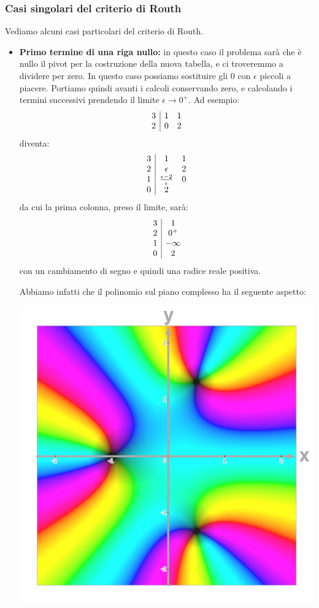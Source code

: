 \documentclass[a4paper,11pt]{article}
\begin{document}
\subsubsection{Casi singolari del criterio di Routh}
Vediamo alcuni casi particolari del criterio di Routh.
\begin{itemize}
\item \textbf{Primo termine di una riga nullo:} in questo caso il problema sarà che è nullo il pivot per la costruzione della nuova tabella, e ci troveremmo a dividere per zero.
In questo caso possiamo sostituire gli 0 con $\epsilon$ piccoli a piacere.
Portiamo quindi avanti i calcoli conservando zero, e calcolando i termini successivi prendendo il limite $\epsilon \rightarrow 0^+$.
Ad esempio:
$$
\begin{array}{c | c c}
	3 & 1 & 1 \\
	2 & 0 & 2
\end{array}
$$
diventa:
$$
\begin{array}{c | c c}
	3 & 1 & 1 \\
	2 & \epsilon & 2 \\
	1 & \frac{\epsilon - 2}{\epsilon} & 0 \\
	0 & 2
\end{array}
$$
da cui la prima colonna, preso il limite, sarà:
$$
\begin{array}{c | c}
	3 & 1 \\
	2 & 0^+ \\
	1 & - \infty \\
	0 & 2
\end{array}
$$
con un cambiamento di segno e quindi una radice reale positiva.

\noindent
\begin{minipage}{\textwidth}
Abbiamo infatti che il polinomio sul piano complesso ha il seguente aspetto:
\begin{center}
	\includegraphics[scale=0.3]{../figures/polynomial_routh_1.png}
\end{center}
\end{minipage}


\end{itemize}
\end{document}
